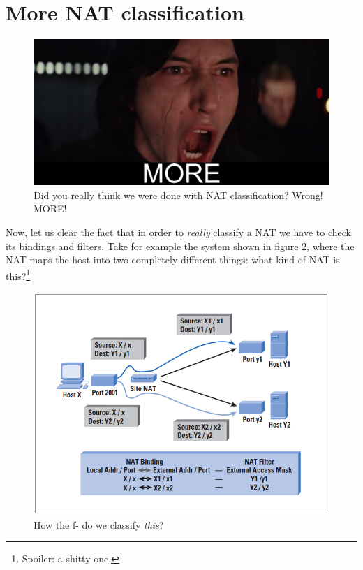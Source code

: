 
\section{More NAT classification}
\begin{figure}[h]
    \centering
    \includegraphics[scale=0.5]{img/more_meme.png}
    \decoRule
    \caption{Did you really think we were done with NAT classification? Wrong! MORE!}
    \label{fig:more_nat_meme}
\end{figure}

Now, let us clear the fact that in order to \textit{really} classify a NAT we have to check its bindings and filters. Take for example the system shown in figure \ref{fig:wut_nat}, where the NAT maps the host into two completely different things: what kind of NAT is this?\footnote{Spoiler: a shitty one.}

\begin{figure}[h]
    \centering
    \includegraphics[scale=0.6]{img/wut_nat.png}
    \decoRule
    \caption{How the f- do we classify \textit{this}?}
    \label{fig:wut_nat}
\end{figure}

